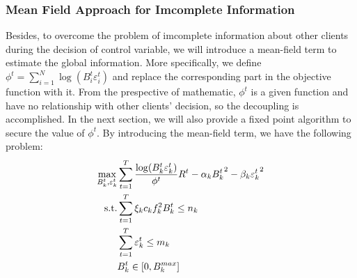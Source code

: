 \documentclass[conference]{IEEEtran}
\begin{document}
\subsubsection{Mean Field Approach for Imcomplete Information}
Besides, to overcome the problem of imcomplete information about other clients during the decision of control variable, we will introduce a mean-field term to estimate the global information. 
More specifically, we define $\phi^t=\sum_{i=1}^N \log(B_i^t \varepsilon_i^t)$ and replace the corresponding part in the objective function with it. 
From the prespective of mathematic, $\phi^t$ is a given function and have no relationship with other clients' decision, so the decoupling is accomplished.
In the next section, we will also provide a fixed point algorithm to secure the value of $\phi^t$.
By introducing the mean-field term, we have the following problem:
\begin{alignat}{2}
    \mathop{\max}_{B_k^t, \varepsilon_k^t} & \sum_{t=1}^T {\log(B_k^t\varepsilon_k^t) \over \phi^t}R^t-\alpha_k {B_k^t}^2-\beta_k {\varepsilon_k^t}^2\\
    \text{s.t.} & \sum_{t=1}^T\xi_kc_kf_k^2B_k^t \leq n_k \\
                & \sum_{t=1}^T\varepsilon_k^t \leq m_k \\
                & B_k^t \in [0, B_k^{max}]  
\end{alignat}
\end{document}
